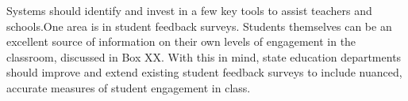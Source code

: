 Systems should identify and invest in a few key tools to assist teachers and schools.One area is in student feedback surveys. Students themselves can be an excellent source of information on their own levels of engagement in the classroom, discussed in %
Box XX\@.
With this in mind, state education departments should improve and extend existing student feedback surveys to include nuanced, accurate measures of student engagement in class. 
